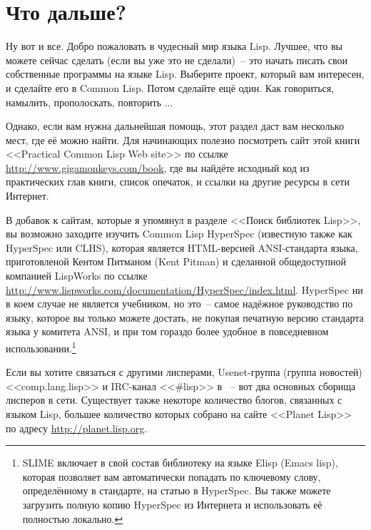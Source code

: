 \section{Что дальше?}

Ну вот и все. Добро пожаловать в чудесный мир языка Lisp. Лучшее, что вы можете сейчас
сделать (если вы уже это не сделали)~-- это начать писать свои собственные программы на
языке Lisp. Выберите проект, который вам интересен, и сделайте его в Common Lisp. Потом
сделайте ещё один. Как говориться, намылить, прополоскать, повторить ...

Однако, если вам нужна дальнейшая помощь, этот раздел даст вам несколько мест, где её
можно найти. Для начинающих полезно посмотреть сайт этой книги <<Practical Common Lisp Web
site>> по ссылке \url{http://www.gigamonkeys.com/book}, где вы найдёте исходный код из
практических глав книги, список опечаток, и ссылки на другие ресурсы в сети Интернет.

В добавок к сайтам, которые я упомянул в разделе <<Поиск библиотек Lisp>>, вы возможно
заходите изучить Common Lisp HyperSpec (известную также как HyperSpec или CLHS), которая
является HTML-версией ANSI-стандарта языка, приготовленой Кентом Питманом (Kent Pitman) и
сделанной общедоступной компанией LispWorks по ссылке
\url{http://www.lispworks.com/documentation/HyperSpec/index.html}. HyperSpec ни в коем
случае не является учебником, но это~-- самое надёжное руководство по языку, которое вы
только можете достать, не покупая печатную версию стандарта языка у комитета ANSI, и при
том гораздо более удобное в повседневном использовании.\footnote{SLIME включает в свой
  состав библиотеку на языке Elisp (Emacs lisp), которая позволяет вам автоматически
  попадать по ключевому слову, определённому в стандарте, на статью в HyperSpec. Вы также
  можете загрузить полную копию HyperSpec из Интернета и использовать её полностью
  локально.}

Если вы хотите связаться с другими лисперами, Usenet-группа (группа новостей)
<<comp.lang.lisp>> и IRC-канал <<\#lisp>> в ~-- вот два основных сборища лисперов в сети. Существует также некоторе количество блогов,
связанных с языком Lisp, большее количество которых собрано на сайте <<Planet Lisp>>
по адресу \url{http://planet.lisp.org}.

